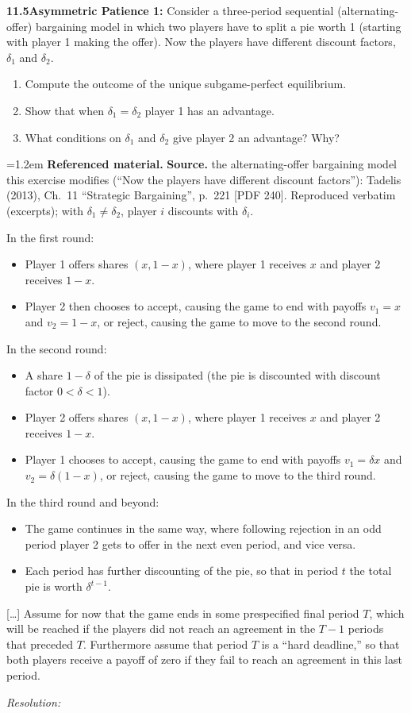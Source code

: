 \documentclass[11pt,a4paper]{article}
\newcommand{\espacoresol}{3.5cm}   %
\newenvironment{referencia}[1]{\par\smallskip\noindent
  \begin{minipage}{\linewidth}\small\leftskip=1.2em
  \noindent\textbf{Referenced material.} {\color{black!70}\textbf{Source.} #1}\par\smallskip}%
  {\end{minipage}\par}
\newcommand{\rot}[1]{\textbf{#1}\quad}
\newcommand{\resolespaco}{\par\textit{Resolution:}\vspace{\espacoresol}\par}
\newenvironment{partes}{\begin{enumerate}[label=\alph*.,leftmargin=2em]}{\end{enumerate}}
\begin{document}
\rot{11.5}\textbf{Asymmetric Patience 1:} Consider a three-period sequential (alternating-offer)
bargaining model in which two players have to split a pie worth 1 (starting with player 1 making
the offer). Now the players have different discount factors, $\delta_1$ and $\delta_2$.
\begin{partes}
\item Compute the outcome of the unique subgame-perfect equilibrium.
\item Show that when $\delta_1 = \delta_2$ player 1 has an advantage.
\item What conditions on $\delta_1$ and $\delta_2$ give player 2 an advantage? Why?
\end{partes}

\begin{referencia}{the alternating-offer bargaining model this exercise modifies (``Now the
players have different discount factors''): Tadelis (2013), Ch.~11 ``Strategic Bargaining'',
p.~221 [PDF 240]. Reproduced verbatim (excerpts); with $\delta_1 \neq \delta_2$, player $i$
discounts with $\delta_i$.}
In the first round:
\begin{itemize}[leftmargin=1.6em]
\item Player 1 offers shares $(x, 1 - x)$, where player 1 receives $x$ and player 2 receives $1 - x$.
\item Player 2 then chooses to accept, causing the game to end with payoffs $v_1 = x$ and
$v_2 = 1 - x$, or reject, causing the game to move to the second round.
\end{itemize}
In the second round:
\begin{itemize}[leftmargin=1.6em]
\item A share $1 - \delta$ of the pie is dissipated (the pie is discounted with discount factor
$0 < \delta < 1$).
\item Player 2 offers shares $(x, 1 - x)$, where player 1 receives $x$ and player 2 receives $1 - x$.
\item Player 1 chooses to accept, causing the game to end with payoffs $v_1 = \delta x$ and
$v_2 = \delta(1 - x)$, or reject, causing the game to move to the third round.
\end{itemize}
In the third round and beyond:
\begin{itemize}[leftmargin=1.6em]
\item The game continues in the same way, where following rejection in an odd period player 2 gets
to offer in the next even period, and vice versa.
\item Each period has further discounting of the pie, so that in period $t$ the total pie is worth
$\delta^{t-1}$.
\end{itemize}
[\ldots] Assume for now that the game ends in some prespecified final period $T$, which will be
reached if the players did not reach an agreement in the $T - 1$ periods that preceded $T$.
Furthermore assume that period $T$ is a ``hard deadline,'' so that both players receive a payoff of
zero if they fail to reach an agreement in this last period.
\end{referencia}
\resolespaco
\end{document}
